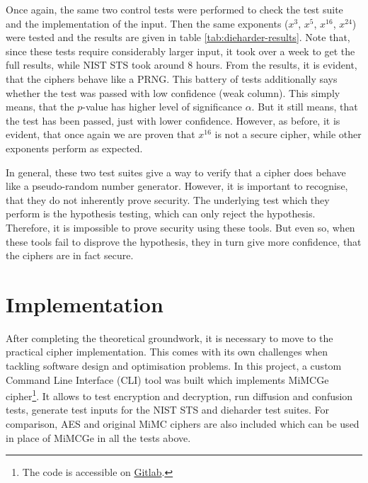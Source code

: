 \documentclass{Resources/UoBLab1}
\theoremstyle{definition}
\begin{document}
Once again, the same two control tests were performed to check the test suite and the implementation of the input. Then the same exponents ($x^3$, $x^5$, $x^{16}$, $x^{24}$) were tested and the results are given in table \ref{tab:dieharder-results}. Note that, since these tests require considerably larger input, it took over a week to get the full results, while NIST STS took around 8 hours. From the results, it is evident, that the ciphers behave like a PRNG. This battery of tests additionally says whether the test was passed with low confidence (weak column). This simply means, that the $p$-value has higher level of significance $\alpha$. But it still means, that the test has been passed, just with lower confidence. However, as before, it is evident, that once again we are proven that $x^{16}$ is not a secure cipher, while other exponents perform as expected.

In general, these two test suites give a way to verify that a cipher does behave like a pseudo-random number generator. However, it is important to recognise, that they do not inherently prove security. The underlying test which they perform is the hypothesis testing, which can only reject the hypothesis. Therefore, it is impossible to prove security using these tools. But even so, when these tools fail to disprove the hypothesis, they in turn give more confidence, that the ciphers are in fact secure.


\section{Implementation}\label{chapter:implementation}
After completing the theoretical groundwork, it is necessary to move to the practical cipher implementation. This comes with its own challenges when tackling software design and optimisation problems. In this project, a custom Command Line Interface (CLI) tool was built which implements MiMCGe cipher\footnote{\label{note:git}The code is accessible on \href{https://git.cs.bham.ac.uk/projects-2023-24/sxt063}{Gitlab}.}. It allows to test encryption and decryption, run diffusion and confusion tests, generate test inputs for the NIST STS and dieharder test suites. For comparison, AES and original MiMC ciphers are also included which can be used in place of MiMCGe in all the tests above.
\end{document}

